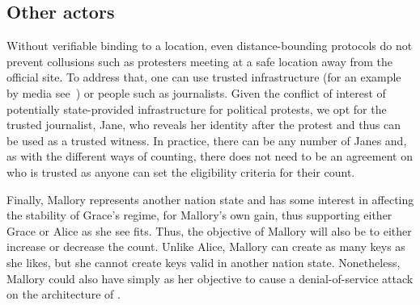 \subsection{Other actors}

Without verifiable binding to a location, even distance-bounding protocols do not prevent collusions such as protesters meeting at a safe location away from the official site. 
To address that, one can use trusted infrastructure (for an example by media see~\cite{LeMondeProtestingSolution}) or people such as journalists. 
Given the conflict of interest of potentially state-provided infrastructure for political protests, we opt for the trusted journalist, Jane, who reveals her identity after the protest and thus can be used as a trusted witness. 
In practice, there can be any number of  Janes and, as with the different ways of counting, there does not need to be an agreement on who is trusted as anyone can set the eligibility criteria for their count.

Finally, Mallory represents another nation state and has some interest in affecting the stability of Grace's regime, for Mallory's own gain, thus supporting either Grace or Alice as she see fits.  
Thus, the objective of Mallory will also be to either increase or decrease the count. 
Unlike Alice, Mallory can create as many keys as she likes, but she cannot create keys valid in another nation state. 
Nonetheless, Mallory could also have simply as her objective to cause a denial-of-service attack on the architecture of \PRIVO.



